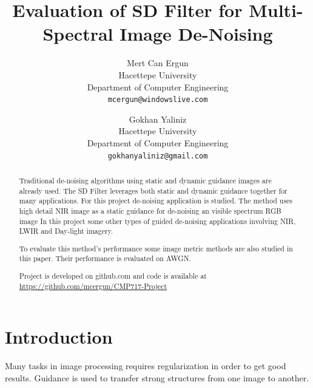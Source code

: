 \documentclass[10pt,twocolumn,letterpaper]{article}
\begin{document}
	
	\title{Evaluation of SD Filter for Multi-Spectral Image De-Noising}
	
	\author{Mert Can Ergun\\
		Hacettepe University\\
		Department of Computer Engineering\\
		{\tt\small mcergun@windowslive.com}
		\and
		Gokhan Yaliniz\\
		Hacettepe University\\
		Department of Computer Engineering\\
		{\tt\small gokhanyaliniz@gmail.com}
	}
	
	\maketitle
	
	\begin{abstract}
		Traditional de-noising algorithms using static and dynamic guidance images are already used. The SD Filter leverages both static and dynamic guidance together for many applications. For this project de-noising application is studied. The method uses high detail NIR image as a static guidance for de-noising an visible spectrum RGB image\cite{ham2015robust} In this project some other types of guided de-noising applications involving NIR, LWIR and Day-light imagery.
		
		To evaluate this method's performance some image metric methods are also studied in this paper. Their performance is evaluated on AWGN.
		
		Project is developed on github.com and code is available at \href{https://github.com/mcergun/CMP717-Project}{https://github.com/mcergun/CMP717-Project}
	\end{abstract}
	
	\section{Introduction}
	
	Many tasks in image processing requires regularization in order to get good results. Guidance is used to transfer strong structures from one image to another. 
	
\end{document}
